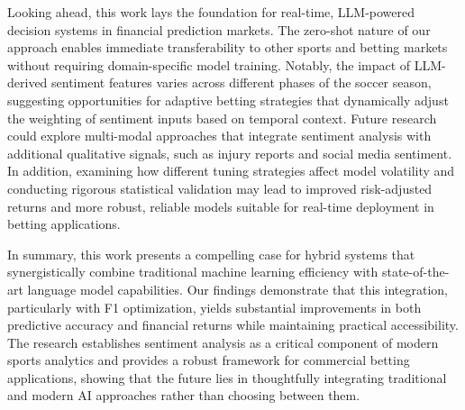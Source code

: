 \documentclass[conference]{IEEEtran}
\begin{document}

Looking ahead, this work lays the foundation for real-time, LLM-powered decision systems in financial prediction markets. The zero-shot nature of our approach enables immediate transferability to other sports and betting markets without requiring domain-specific model training. Notably, the impact of LLM-derived sentiment features varies across different phases of the soccer season, suggesting opportunities for adaptive betting strategies that dynamically adjust the weighting of sentiment inputs based on temporal context. Future research could explore multi-modal approaches that integrate sentiment analysis with additional qualitative signals, such as injury reports and social media sentiment. In addition, examining how different tuning strategies affect model volatility and conducting rigorous statistical validation may lead to improved risk-adjusted returns and more robust, reliable models suitable for real-time deployment in betting applications.


In summary, this work presents a compelling case for hybrid systems that synergistically combine traditional machine learning efficiency with state-of-the-art language model capabilities. Our findings demonstrate that this integration, particularly with F1 optimization, yields substantial improvements in both predictive accuracy and financial returns while maintaining practical accessibility. The research establishes sentiment analysis as a critical component of modern sports analytics and provides a robust framework for commercial betting applications, showing that the future lies in thoughtfully integrating traditional and modern AI approaches rather than choosing between them.

\balance


\end{document}
